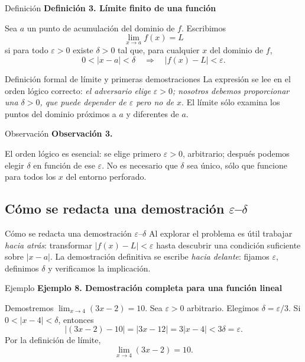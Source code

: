 \documentclass[12pt,aspectratio=169]{beamer}
\begin{document}
\begin{frame}[t,allowframebreaks]{Definición}
{\color{azul}\bfseries Definición 3. Límite finito de una función}\par\medskip

Sea $a$ un punto de acumulación del dominio de $f$. Escribimos
\[
 \lim_{x\to a}f(x)=L
\]
si para todo $\varepsilon>0$ existe $\delta>0$ tal que, para cualquier $x$ del dominio de $f$,
\[
 \boxed{0<|x-a|<\delta\quad\Longrightarrow\quad |f(x)-L|<\varepsilon.}
\]
\end{frame}


\begin{frame}[t,allowframebreaks]{Definición formal de límite y primeras demostraciones}
La expresión se lee en el orden lógico correcto: \emph{el adversario elige $\varepsilon>0$; nosotros debemos proporcionar una $\delta>0$, que puede depender de $\varepsilon$ pero no de $x$}. El límite sólo examina los puntos del dominio próximos a $a$ y diferentes de $a$.
\end{frame}


\begin{frame}[t,allowframebreaks]{Observación}
{\color{azul}\bfseries Observación 3.}\par\medskip

El orden lógico es esencial: se elige primero $\varepsilon>0$, arbitrario; después podemos elegir $\delta$ en función de ese $\varepsilon$. No es necesario que $\delta$ sea único, sólo que funcione para todos los $x$ del entorno perforado.
\end{frame}


\subsection{Cómo se redacta una demostración $\varepsilon$--$\delta$}

\begin{frame}[t,allowframebreaks]{Cómo se redacta una demostración $\varepsilon$--$\delta$}
Al explorar el problema es útil trabajar \emph{hacia atrás}: transformar $|f(x)-L|<\varepsilon$ hasta descubrir una condición suficiente sobre $|x-a|$. La demostración definitiva se escribe \emph{hacia delante}: fijamos $\varepsilon$, definimos $\delta$ y verificamos la implicación.
\end{frame}


\begin{frame}[t,allowframebreaks]{Ejemplo}
{\color{azul}\bfseries Ejemplo 8. Demostración completa para una función lineal}\par\medskip

Demostremos $\lim_{x\to4}(3x-2)=10$. Sea $\varepsilon>0$ arbitrario. Elegimos $\delta=\varepsilon/3$. Si $0<|x-4|<\delta$, entonces
\[
 |(3x-2)-10|=|3x-12|=3|x-4|<3\delta=\varepsilon.
\]
Por la definición de límite,
\[
 \boxed{\lim_{x\to4}(3x-2)=10.}
\]
\end{frame}
\end{document}
